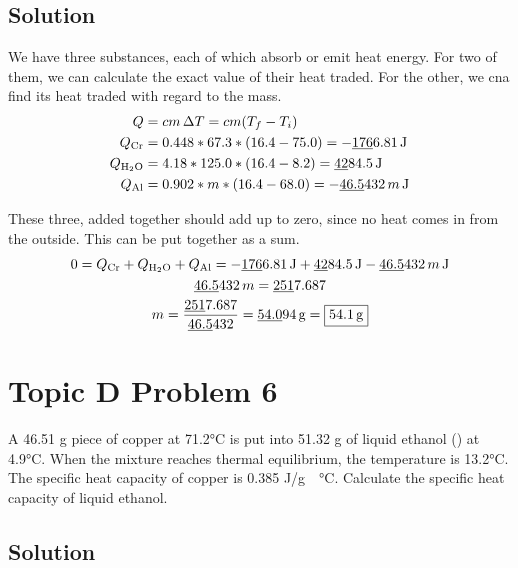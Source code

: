 \documentclass[10pt]{article}
\newcommand{\U}[1]{\underline{#1}}
\begin{document}
        \subsection{Solution}
            We have three substances, each of which absorb or emit heat energy.
            For two of them, we can calculate the exact value of their heat traded.
            For the other, we cna find its heat traded with regard to the mass.
            \begin{align}
                Q   &=  cm\,\Delta T
                    =   cm(T_f - T_i)\\
                Q_{\rm Cr}  &=  0.448 * 67.3 * (16.4 - 75.0)
                    =   -\U{176}6.81\,\unit{\joule}\\
                Q_{\rm H_2O}    &=  4.18 * 125.0 * (16.4 - 8.2)
                    =   \U{42}84.5\,\unit{\joule}\\
                Q_{\rm Al}  &=  0.902 * m * (16.4 - 68.0)
                    =   -\U{46.5}432\,m\,\unit{\joule}
            \end{align}

            These three, added together should add up to zero, since no heat comes in from the outside.
            This can be put together as a sum.
            \begin{gather}
                0   =   Q_{\rm Cr} + Q_{\rm H_2O} + Q_{\rm Al}
                    =   -\U{176}6.81\,\unit{\joule} + \U{42}84.5\,\unit{\joule} - \U{46.5}432\,m\,\unit{\joule}\\
                \U{46.5}432\,m  =   \U{251}7.687\\
                m   =   \frac{\U{251}7.687}{\U{46.5}432}
                    =   \U{54.0}94\,\unit{\gram}
                    =   \boxed{54.1\,\unit{\gram}}
            \end{gather}

    \pagebreak
    \section{Topic D Problem 6}
        A 46.51 g piece of copper at 71.2\unit{\celsius} is put into 51.32 g of liquid ethanol () at 4.9\unit{\celsius}.
        When the mixture reaches thermal equilibrium, the temperature is 13.2\unit{\celsius}. 
        The specific heat capacity of copper is 0.385 \unit{\joule/\gram\cdot\celsius}. 
        Calculate the specific heat capacity of liquid ethanol.

        \subsection{Solution}
\end{document}
